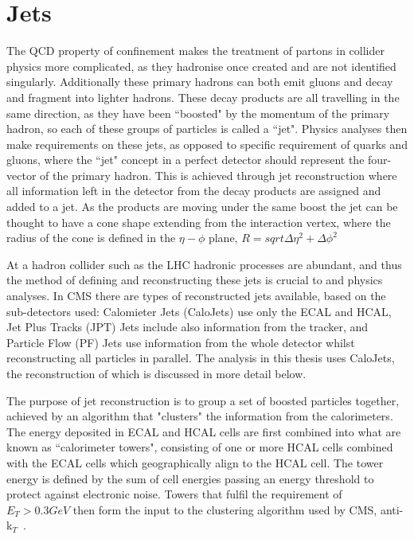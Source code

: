 \section{Jets}
\label{sec:reconjet}
 The QCD property of confinement makes the treatment of partons in collider physics more complicated, as they hadronise once created and are not identified singularly. Additionally these primary hadrons can both emit gluons and decay and fragment into lighter hadrons. These decay products are all travelling in the same direction, as they have been ``boosted" by the momentum of the primary hadron, so each of these groups of particles is called a ``jet". Physics analyses then make requirements on these jets, as opposed to specific requirement of quarks and gluons, where the ``jet" concept in a perfect detector should represent the four-vector of the primary hadron. This is achieved through jet reconstruction where all information left in the detector from the decay products are assigned and added to a jet. As the products are moving under the same boost the jet can be thought to have a cone shape extending from the interaction vertex, where the radius of the cone is defined in the $\eta-\phi$ plane, $R= sqrt{\Delta \eta^{2} + \Delta \phi^{2}}$
 
 At a hadron collider such as the LHC hadronic processes are abundant, and thus the method of defining and reconstructing these jets is crucial to and physics analyses. In CMS there are types of reconstructed jets available, based on the sub-detectors used: Calomieter Jets (CaloJets) use only the ECAL and HCAL, Jet Plus Tracks (JPT) Jets include also information from the tracker, and Particle Flow (PF) Jets use information from the whole detector whilst reconstructing all particles in parallel. The analysis in this thesis uses CaloJets, the reconstruction of which is discussed in more detail below. 
 
 The purpose of jet reconstruction is to group a set of boosted particles together, achieved by an algorithm that "clusters" the information from the calorimeters. The energy deposited in ECAL and HCAL cells are first combined into what are known as ``calorimeter towers", consisting of one or more HCAL cells combined with the ECAL cells which geographically align to the HCAL cell. The tower energy is defined by the sum of cell energies passing an energy threshold to protect against electronic noise. Towers that fulfil the requirement of $E_{T} > 0.3 GeV$ then form the input to the clustering algorithm used by CMS, anti-k$_{T}$~\cite{jetroundup}.

